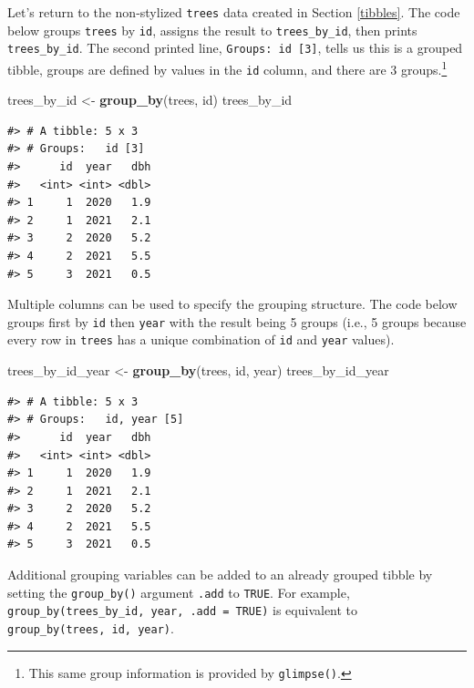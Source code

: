 \documentclass[
  11pt,
]{krantz}
\newenvironment{Shaded}{\begin{snugshade}}{\end{snugshade}}
\newcommand{\KeywordTok}[1]{\textcolor[rgb]{0.13,0.29,0.53}{\textbf{#1}}}
\newcommand{\NormalTok}[1]{#1}
\newcommand{\StringTok}[1]{\textcolor[rgb]{0.31,0.60,0.02}{#1}}
\theoremstyle{definition}
\theoremstyle{definition}
\theoremstyle{definition}
\theoremstyle{definition}
\theoremstyle{remark}
\begin{document}
Let's return to the non-stylized \texttt{trees} data created in Section \ref{tibbles}. The code below groups \texttt{trees} by \texttt{id}, assigns the result to \texttt{trees\_by\_id}, then prints \texttt{trees\_by\_id}. The second printed line, \texttt{Groups:\ id\ {[}3{]}}, tells us this is a grouped tibble, groups are defined by values in the \texttt{id} column, and there are 3 groups.\footnote{This same group information is provided by \texttt{glimpse()}.}

\begin{Shaded}
\begin{Highlighting}[]
\NormalTok{trees\_by\_id \textless{}{-}}\StringTok{ }\KeywordTok{group\_by}\NormalTok{(trees, id)}
\NormalTok{trees\_by\_id}
\end{Highlighting}
\end{Shaded}

\begin{verbatim}
#> # A tibble: 5 x 3
#> # Groups:   id [3]
#>      id  year   dbh
#>   <int> <int> <dbl>
#> 1     1  2020   1.9
#> 2     1  2021   2.1
#> 3     2  2020   5.2
#> 4     2  2021   5.5
#> 5     3  2021   0.5
\end{verbatim}

Multiple columns can be used to specify the grouping structure. The code below groups first by \texttt{id} then \texttt{year} with the result being 5 groups (i.e., 5 groups because every row in \texttt{trees} has a unique combination of \texttt{id} and \texttt{year} values).

\begin{Shaded}
\begin{Highlighting}[]
\NormalTok{trees\_by\_id\_year \textless{}{-}}\StringTok{ }\KeywordTok{group\_by}\NormalTok{(trees, id, year) }
\NormalTok{trees\_by\_id\_year}
\end{Highlighting}
\end{Shaded}

\begin{verbatim}
#> # A tibble: 5 x 3
#> # Groups:   id, year [5]
#>      id  year   dbh
#>   <int> <int> <dbl>
#> 1     1  2020   1.9
#> 2     1  2021   2.1
#> 3     2  2020   5.2
#> 4     2  2021   5.5
#> 5     3  2021   0.5
\end{verbatim}

Additional grouping variables can be added to an already grouped tibble by setting the \texttt{group\_by()} argument \texttt{.add} to \texttt{TRUE}. For example, \texttt{group\_by(trees\_by\_id,\ year,\ .add\ =\ TRUE)} is equivalent to \texttt{group\_by(trees,\ id,\ year)}.
\end{document}

